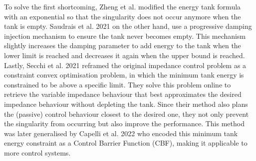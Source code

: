 To solve the first shortcoming, Zheng et al. \cite{zhengTimeVaryingImpedanceControl2018} modified the energy tank formula with an exponential so that the singularity does not occur anymore when the tank is empty. Saudrais et al. 2021 \cite{saudraisRateModeBilateral2021} on the other hand, use a progressive damping injection mechanism to ensure the tank never becomes empty. This mechanism slightly increases the damping parameter to add energy to the tank when the lower limit is reached and decreases it again when the upper bound is reached. Lastly, Secchi et al. 2021 \cite{secchiEnergyOptimizationRobust2019} reframed the original impedance control problem as a constraint convex optimisation problem, in which the minimum tank energy is constrained to be above a specific limit. They solve this problem online to retrieve the variable impedance behaviour that best approximates the desired impedance behaviour without depleting the tank. Since their method also plans the (passive) control behaviour closest to the desired one, they not only prevent the singularity from occurring but also improve the performance. This method was later generalised by Capelli et al. 2022 \cite{capelliPassivityControlBarrier2022} who encoded this minimum tank energy constraint as a Control Barrier Function (CBF), making it applicable to more control systems.

